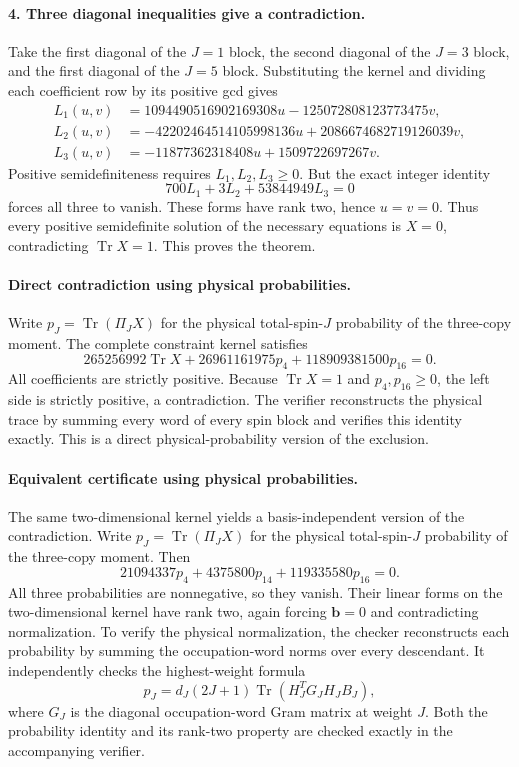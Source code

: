 \documentclass[11pt]{article}
\newcommand{\Tr}{\operatorname{Tr}}
\begin{document}
\paragraph{4. Three diagonal inequalities give a contradiction.}
Take the first diagonal of the $J=1$ block, the second diagonal of
the $J=3$ block, and the first diagonal of the $J=5$ block. Substituting
the kernel and dividing each coefficient row by its positive gcd gives
\[
\begin{aligned}
L_1(u,v)&=1094490516902169308u-125072808123773475v,\\
L_2(u,v)&=-42202464514105998136u+2086674682719126039v,\\
L_3(u,v)&=-11877362318408u+1509722697267v.
\end{aligned}
\]
Positive semidefiniteness requires $L_1,L_2,L_3\ge0$. But the exact
integer identity
\[
\boxed{700L_1+3L_2+53844949L_3=0}
\]
forces all three to vanish. These forms have rank two, hence $u=v=0$.
Thus every positive semidefinite solution of the necessary equations
is $X=0$, contradicting $\Tr X=1$. This proves the theorem.

\paragraph{Direct contradiction using physical probabilities.}
Write $p_J=\Tr(\Pi_JX)$ for the physical total-spin-$J$ probability
of the three-copy moment. The complete constraint kernel satisfies
\[
\boxed{265256992\Tr X+26961161975p_4+118909381500p_{16}=0.}
\]
All coefficients are strictly positive. Because $\Tr X=1$ and
$p_4,p_{16}\ge0$, the left side is strictly positive, a contradiction.
The verifier reconstructs the physical trace by summing every word of
every spin block and verifies this identity exactly. This is a direct
physical-probability version of the exclusion.

\paragraph{Equivalent certificate using physical probabilities.}
The same two-dimensional kernel yields a basis-independent version of
the contradiction. Write $p_J=\Tr(\Pi_J X)$ for the physical total-spin-$J$
probability of the three-copy moment. Then
\[
\boxed{21094337p_4+4375800p_{14}+119335580p_{16}=0.}
\]
All three probabilities are nonnegative, so they vanish. Their linear
forms on the two-dimensional kernel have rank two, again forcing
$\mathbf b=0$ and contradicting normalization. To verify the physical
normalization, the checker reconstructs each probability by summing
the occupation-word norms over every descendant. It independently
checks the highest-weight formula
\[
p_J=d_J(2J+1)\Tr\!\left(H_J^T G_JH_J B_J\right),
\]
where $G_J$ is the diagonal occupation-word Gram matrix at weight $J$.
Both the probability identity and its rank-two property are checked
exactly in the accompanying verifier.
\end{document}
